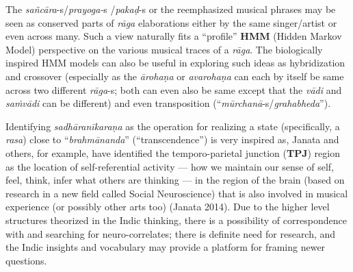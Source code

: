 The \textsl{sañcāra}-s/\textsl{prayoga-}s
/\textsl{pakaḍ}-s or the reemphasized musical phrases may be seen as conserved parts of \textsl{rāga} elaborations either by the same singer/artist or even across many. Such a view naturally fits a “profile” \textbf{HMM} (Hidden Markov Model) perspective on the various musical traces of a \textsl{rāga}. The biologically inspired HMM models can also be useful in exploring such ideas as hybridization and crossover (especially as the \textsl{ārohaṇa} or \textsl{avarohaṇa} can each by itself be same across two different \textsl{rāga}-s; both can even also be same except that the \textsl{vādi} and \textsl{saṁvādi} can be different) and even transposition (“\hbox{\textsl{mūrchanā}-s}/\textsl{grahabheda}”).

\newpage

Identifying \textsl{sadhāranīkaraṇa} as the operation for realizing a state (specifically, a \textsl{rasa}) close to “\textsl{brahmānanda}” (“transcendence”) is very inspired as, Janata and others, for example, have identified the temporo-parietal junction (\textbf{TPJ}) region as the location of self-referential activity — how we maintain our sense of self, feel, think, infer what others are thinking --- in the region of the brain (based on research in a new field called Social Neuroscience) that is also involved in musical experience (or possibly other arts too) (Janata 2014). Due to the higher level structures theorized in the Indic thinking, there is a possibility of correspondence with and searching for neuro-correlates; there is definite need for research, and the Indic insights and vocabulary may provide a platform for framing newer questions.

